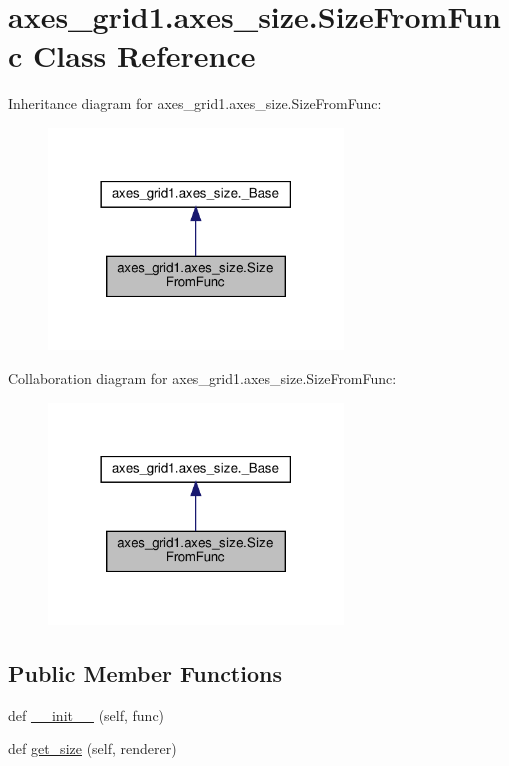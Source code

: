\hypertarget{classaxes__grid1_1_1axes__size_1_1SizeFromFunc}{}\section{axes\+\_\+grid1.\+axes\+\_\+size.\+Size\+From\+Func Class Reference}
\label{classaxes__grid1_1_1axes__size_1_1SizeFromFunc}


Inheritance diagram for axes\+\_\+grid1.\+axes\+\_\+size.\+Size\+From\+Func\+:
\nopagebreak
\begin{figure}[H]
\begin{center}
\leavevmode
\includegraphics[width=222pt]{classaxes__grid1_1_1axes__size_1_1SizeFromFunc__inherit__graph}
\end{center}
\end{figure}


Collaboration diagram for axes\+\_\+grid1.\+axes\+\_\+size.\+Size\+From\+Func\+:
\nopagebreak
\begin{figure}[H]
\begin{center}
\leavevmode
\includegraphics[width=222pt]{classaxes__grid1_1_1axes__size_1_1SizeFromFunc__coll__graph}
\end{center}
\end{figure}
\subsection*{Public Member Functions}
\begin{DoxyCompactItemize}
\item 
def \hyperlink{classaxes__grid1_1_1axes__size_1_1SizeFromFunc_aeb4360cb7f5093e794b4c689eb7862f0}{\+\_\+\+\_\+init\+\_\+\+\_\+} (self, func)
\item 
def \hyperlink{classaxes__grid1_1_1axes__size_1_1SizeFromFunc_a52e9756e195f73e32f2a7b3300221cfe}{get\+\_\+size} (self, renderer)
\end{DoxyCompactItemize}


